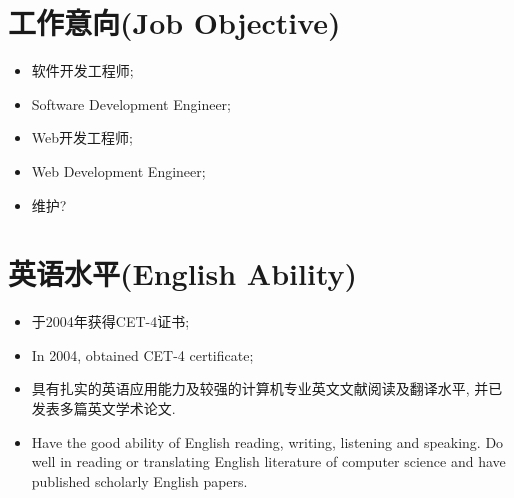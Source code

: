 \documentclass[a4paper,10pt,english]{manual}
\begin{document}
\section{工作意向(Job Objective)}
\begin{itemize}
\item {} 
软件开发工程师;

\item {} 
Software Development Engineer;

\item {} 
Web开发工程师;

\item {} 
Web Development Engineer;

\item {} 
维护?

\end{itemize}


\section{英语水平(English Ability)}
\begin{itemize}
\item {} 
于2004年获得CET-4证书;

\item {} 
In 2004, obtained CET-4 certificate;

\item {} 
具有扎实的英语应用能力及较强的计算机专业英文文献阅读及翻译水平, 并已发表多篇英文学术论文.

\item {} 
Have the good ability of English reading, writing, listening and speaking. Do well in reading or translating English literature of computer science and have published scholarly English papers.

\end{itemize}
\end{document}

